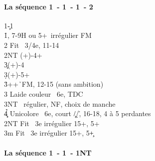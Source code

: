 \documentclass[a4paper]{article}
\begin{document}
\paragraph{La séquence 1\pdfc\ - 1\pdfh\ - 1\pdfs\ - 2\pdfh}

\begin{bidtable}
1\c-1\h\\
1\h {}\s , 7-9H ou 5+\s\ irrégulier FM\\
2\s \> Fit \s\ 3/4e, 11-14\+\\
2NT (+)-4+\c \\
3\c {}(+)-4\d \\
3\d {}(+)-5+\d \\
3\h {}++\h\ FM, 12-15 (sans ambition)\\
3\s \> Laide couleur \s\ 6e, TDC\\
3NT \s\ régulier, NF, choix de manche\\
4\c\d\h \> Unicolore \s\ 6e, court \c /\d /\h , 16-18, 4 à 5 perdantes\-\\
2NT \> Fit \s\ 3e irrégulier 15+, 5+\c \\
3m \> Fit \s\ 3e irrégulier 15+, 5+\c 
\end{bidtable}

\paragraph{La séquence 1\pdfc\ - 1\pdfh\ - 1NT}
\end{document}
